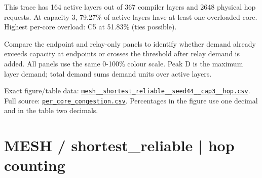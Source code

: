 \documentclass[10pt,a4paper]{article}
\begin{document}
This trace has 164 active layers out of 367 compiler layers and 2648 physical hop requests. At capacity 3, 79.27\% of active layers have at least one overloaded core. Highest per-core overload: C5 at 51.83\% (ties possible).\par
Compare the endpoint and relay-only panels to identify whether demand already exceeds capacity at endpoints or crosses the threshold after relay demand is added. All panels use the same 0-100\% colour scale. Peak D is the maximum layer demand; total demand sums demand units over active layers.\par
Exact figure/table data: \href{\detokenize{file:///home/dhruv-pansuriya/Documents/BTP/Compiler-Driven-ACE/output/pdf/qaoa_methods_congestion/tables/mesh__shortest_reliable__seed44__cap3__hop.csv}}{\nolinkurl{mesh__shortest_reliable__seed44__cap3__hop.csv}}. Full source: \href{\detokenize{file:///home/dhruv-pansuriya/Documents/BTP/Compiler-Driven-ACE/results/qaoa_2seed_2026-10-26/congestion/per_core_congestion.csv}}{\nolinkurl{per_core_congestion.csv}}. Percentages in the figure use one decimal and in the table two decimals.\par
\clearpage
\section*{MESH / shortest\_reliable | hop counting}
\end{document}
